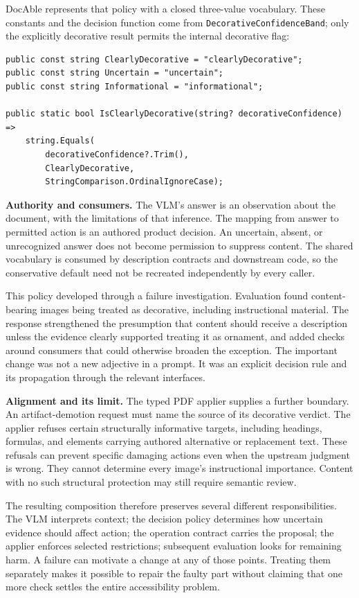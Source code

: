 DocAble represents that policy with a closed three-value vocabulary. These constants and the decision function come from \texttt{DecorativeConfidenceBand}; only the explicitly decorative result permits the internal decorative flag:

\begin{verbatim}
public const string ClearlyDecorative = "clearlyDecorative";
public const string Uncertain = "uncertain";
public const string Informational = "informational";

public static bool IsClearlyDecorative(string? decorativeConfidence) =>
    string.Equals(
        decorativeConfidence?.Trim(),
        ClearlyDecorative,
        StringComparison.OrdinalIgnoreCase);
\end{verbatim}

\textbf{Authority and consumers.} The VLM's answer is an observation about the document, with the limitations of that inference. The mapping from answer to permitted action is an authored product decision. An uncertain, absent, or unrecognized answer does not become permission to suppress content. The shared vocabulary is consumed by description contracts and downstream code, so the conservative default need not be recreated independently by every caller.

This policy developed through a failure investigation. Evaluation found content-bearing images being treated as decorative, including instructional material. The response strengthened the presumption that content should receive a description unless the evidence clearly supported treating it as ornament, and added checks around consumers that could otherwise broaden the exception. The important change was not a new adjective in a prompt. It was an explicit decision rule and its propagation through the relevant interfaces.

\textbf{Alignment and its limit.} The typed PDF applier supplies a further boundary. An artifact-demotion request must name the source of its decorative verdict. The applier refuses certain structurally informative targets, including headings, formulas, and elements carrying authored alternative or replacement text. These refusals can prevent specific damaging actions even when the upstream judgment is wrong. They cannot determine every image's instructional importance. Content with no such structural protection may still require semantic review.

The resulting composition therefore preserves several different responsibilities. The VLM interprets context; the decision policy determines how uncertain evidence should affect action; the operation contract carries the proposal; the applier enforces selected restrictions; subsequent evaluation looks for remaining harm. A failure can motivate a change at any of those points. Treating them separately makes it possible to repair the faulty part without claiming that one more check settles the entire accessibility problem.

